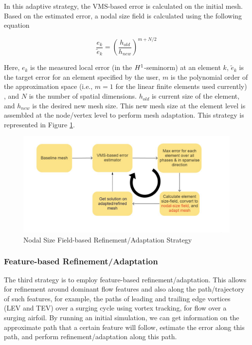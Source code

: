 In this adaptive strategy, the VMS-based error is calculated on the initial mesh. Based on the estimated error, a nodal size field is calculated using the following equation \cite{zhang19}

\begin{equation}
	\frac{e_k}{\tilde{e}_k} = \left(\frac{h_{old}}{h_{new}}\right)^{m+N/2} 
	\label{eq:diez}
\end{equation}

Here, $e_k$ is the measured local error (in the $H^{1}$-seminorm) at an element $k$, $\tilde{e}_k$ is the target error for an element specified by the user, $m$ is the polynomial order of the approximation space (i.e., $m=1$ for the linear finite elements used currently) , and $N$ is the number of spatial dimensions. $h_{old}$ is current size of the element, and $h_{new}$ is the desired new mesh size.
This new mesh size at the element level is assembled at the node/vertex level to perform mesh adaptation.
This strategy is represented in Figure \ref{fig:size_based_strat}.

\begin{figure}[H]
	\centering
	\includegraphics[width=1\textwidth]{figures/adapt_strat/size_based.png}
	\caption{Nodal Size Field-based Refinement/Adaptation Strategy}
	\label{fig:size_based_strat}
\end{figure}

\subsubsection{Feature-based Refinement/Adaptation}

The third strategy is to employ feature-based refinement/adaptation. This allows for refinement around dominant flow features and also along the path/trajectory of such features, for example, the paths of leading and trailing edge vortices (LEV and TEV) over a surging cycle using vortex tracking, for flow over a surging airfoil. By running an initial simulation, we can get information on the approximate path that a certain feature will follow, estimate the error along this path, and perform refinement/adaptation along this path. 

